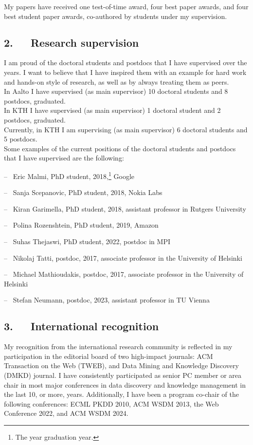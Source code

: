 \documentclass[a4paper,11pt]{article}
\begin{document}
My papers have received one test-of-time award, 
four best paper awards, 
and four best student paper awards, co-authored by students under my supervision. 


\subsection*{2.~~~Research supervision}

I am proud of the doctoral students and postdocs that I have supervised over the years. 
I want to believe that I have inspired them with an example for hard work and hands-on style of research, 
as well as by always treating them as peers. \\
In Aalto I have supervised (as main supervisor) 10 doctoral students and 8 postdocs, graduated. \\
In KTH I have supervised (as main supervisor) 1 doctoral student and 2 postdocs, graduated. \\
Currently, in KTH I am supervising (as main supervisor) 6 doctoral students and 5 postdocs. \\
Some examples of the current positions of the doctoral students and postdocs that I have supervised are the following:
\squishlist
\item[--~] Eric Malmi, PhD student, 2018,\footnote{The year graduation year.} Google
\item[--~] Sanja Scepanovic, PhD student, 2018, Nokia Labs 
\item[--~] Kiran Garimella, PhD student, 2018, assistant professor in Rutgers University
\item[--~] Polina Rozenshtein, PhD student, 2019, Amazon 
\item[--~] Suhas Thejaswi, PhD student, 2022, postdoc in MPI
\item[--~] Nikolaj Tatti, postdoc, 2017, associate professor in the University of Helsinki
\item[--~] Michael Mathioudakis,  postdoc, 2017, associate professor in the University of Helsinki
\item[--~] Stefan Neumann, postdoc, 2023, assistant professor in TU Vienna
\squishend

\subsection*{3.~~~International recognition}

My recognition from the international research community is reflected 
in my participation in the editorial board of two high-impact journals: 
ACM Transaction on the Web (TWEB), and Data Mining and Knowledge Discovery (DMKD) journal. 
I have consistently participated as senior PC member or area chair in 
most major conferences in data discovery and knowledge management in the last 10, or more, years.
Additionally, I have been a program co-chair of the following conferences:
ECML PKDD 2010, ACM WSDM 2013, the Web Conference 2022, and ACM WSDM 2024. 
\end{document}
